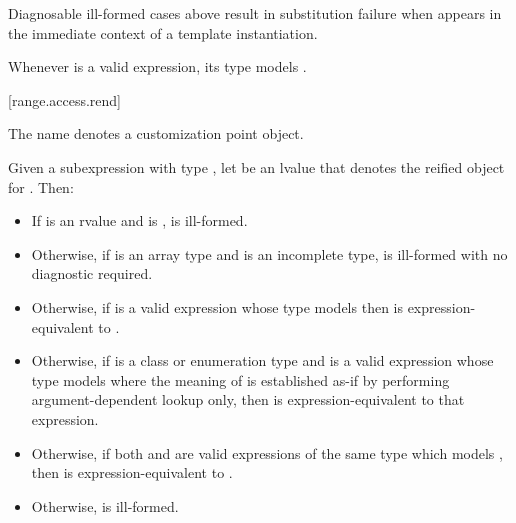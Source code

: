 \pnum
\begin{note}
Diagnosable ill-formed cases above result in substitution failure
when 
appears in the immediate context of a template instantiation.
\end{note}

\pnum
\begin{note}
Whenever  is a valid expression, its type models
.
\end{note}

[range.access.rend]{}
%

\pnum
The name  denotes a customization point
object.

\pnum
Given a subexpression  with type ,
let  be an lvalue that denotes the reified object for .
Then:

\begin{itemize}
\item
  If  is an rvalue and
   is ,
   is ill-formed.

\item
  Otherwise, if  is an array type and
   is an incomplete type,
   is ill-formed with no diagnostic required.

\item
  Otherwise, if 
  is a valid expression whose type models
  then  is expression-equivalent to
  .

\item
  Otherwise, if  is a class or enumeration type and
  is a valid expression whose type models
  where the meaning of  is established as-if by performing
  argument-dependent lookup only,
  then  is expression-equivalent to
  that expression.

\item
  Otherwise, if both  and 
  are valid expressions of the same type which models
  ,
  then  is expression-equivalent to
  .

\item
  Otherwise,  is ill-formed.
\end{itemize}

